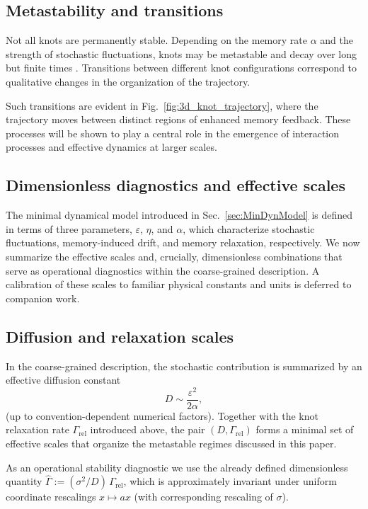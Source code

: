 \documentclass[reprint,amsmath,amssymb,aps,prd,nofootinbib,floatfix]{revtex4-2}
\begin{document}
\subsection{Metastability and transitions}

Not all knots are permanently stable.
Depending on the memory rate $\alpha$ and the strength of stochastic fluctuations, knots
may be metastable and decay over long but finite times \cite{Kramers1940,FreidlinWentzell2012}.
Transitions between different knot configurations correspond to qualitative changes in
the organization of the trajectory.

Such transitions are evident in Fig.~\ref{fig:3d_knot_trajectory}, where the trajectory
moves between distinct regions of enhanced memory feedback.
These processes will be shown to play a central role in the emergence of interaction
processes and effective dynamics at larger scales.

\subsection{Dimensionless diagnostics and effective scales}

The minimal dynamical model introduced in Sec.~\ref{sec:MinDynModel} is defined in terms of three parameters, $\varepsilon$, $\eta$, and $\alpha$, which characterize stochastic fluctuations, memory-induced drift, and memory relaxation, respectively.
We now summarize the effective scales and, crucially, dimensionless combinations that serve as operational diagnostics within the coarse-grained description.
A calibration of these scales to familiar physical constants and units is deferred to companion work.

\subsection{Diffusion and relaxation scales}

In the coarse-grained description, the stochastic contribution is summarized by an effective diffusion constant
\begin{equation}
D \sim \frac{\varepsilon^2}{2\alpha},
\end{equation}
(up to convention-dependent numerical factors). Together with the knot relaxation rate $\Gamma_{\mathrm{rel}}$ introduced above, the pair $(D,\Gamma_{\mathrm{rel}})$ forms a minimal set of effective scales that organize the metastable regimes discussed in this paper.

As an operational stability diagnostic we use the already defined dimensionless quantity $\widehat{\Gamma} := (\sigma^2/D)\,\Gamma_{\mathrm{rel}}$, which is approximately invariant under uniform coordinate rescalings $x\mapsto a x$ (with corresponding rescaling of $\sigma$).
\end{document}
